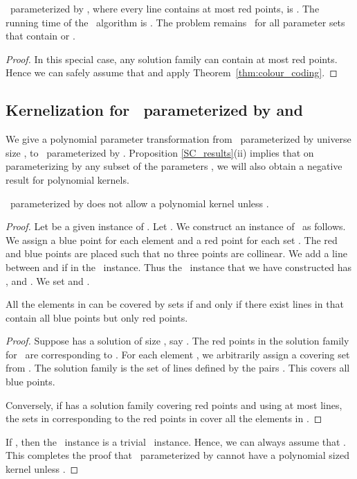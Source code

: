 \begin{corollary}\label{sp_case_red}
\slrbsc\ parameterized by , where every line contains at most  red points, is \FPT. The running time of the \FPT\ algorithm is . The problem remains \FPT\ for all parameter sets  that contain  or . 
\end{corollary}

\begin{proof}
In this special case, any solution family can contain at most  red points. Hence we can safely assume that  and apply Theorem~\ref{thm:colour_coding}. 
\end{proof}
\subsection{Kernelization for \slrbsc\ parameterized by  and }


We give a polynomial parameter transformation from \SC\ parameterized by universe size , to \slrbsc\ parameterized by . Proposition \ref{SC_results}(ii) implies that on parameterizing by any subset of the parameters , we will also obtain a negative result for polynomial kernels.


\begin{thmk}\label{set_cover_redn}
 \slrbsc\ parameterized by  does not allow a polynomial kernel unless .
\end{thmk}
 
\begin{proof}
 
 Let  be a given instance of \SC. Let . We construct an instance  of \slrbsc\ as follows. We assign a blue point  for each element  and a red point  for each set . The red and blue points are placed such that no three points are collinear. We add a line between  and  if  in the \SC\ instance. Thus the \slrbsc\ instance  that we have constructed has ,  and . We set  and .
 
 \begin{claim}
  All the elements in  can be covered by  sets if and only if there exist  lines in  that contain all blue points but only  red points.
 \end{claim}
\begin{proof}
 Suppose  has a solution of size , say . The red points in the solution family for \slrbsc\ are   corresponding to . For each element , we arbitrarily assign a covering set  from . The solution family is the set of lines defined by the pairs 
 . This covers all blue points.

 Conversely, if  has a solution family  covering  red points and using at most  lines, the sets in  corresponding to the red points in  cover all the elements in .
\end{proof}
If , then the \SC\ instance is a trivial \YES\ instance. Hence, we can always assume that .
This completes the proof that \slrbsc\ parameterized by  cannot have a polynomial sized kernel unless .
\end{proof}


